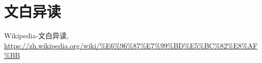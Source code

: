 \section{文白异读}




\begin{thebibliography}{}
    Wikipedia-文白异读, 
    \url{https://zh.wikipedia.org/wiki/%E6%96%87%E7%99%BD%E5%BC%82%E8%AF%BB}
\end{thebibliography}
